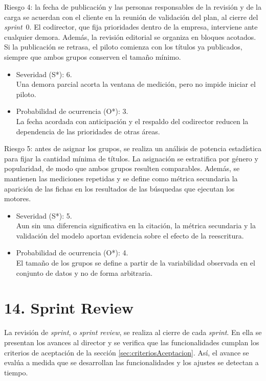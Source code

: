 \documentclass[
11pt, %
codirector, %
]{charter}
\begin{document}
Riesgo 4: la fecha de publicación y las personas responsables de la revisión y de la carga se acuerdan con el cliente en la reunión de validación del plan, al cierre del \textit{sprint}~0. El codirector, que fija prioridades dentro de la empresa, interviene ante cualquier demora. Además, la revisión editorial se organiza en bloques acotados. Si la publicación se retrasa, el piloto comienza con los títulos ya publicados, siempre que ambos grupos conserven el tamaño mínimo.
\begin{itemize}
	\item Severidad (S*): 6.\\
	Una demora parcial acorta la ventana de medición, pero no impide iniciar el piloto.
	\item Probabilidad de ocurrencia (O*): 3.\\
	La fecha acordada con anticipación y el respaldo del codirector reducen la dependencia de las prioridades de otras áreas.
\end{itemize}

Riesgo 5: antes de asignar los grupos, se realiza un análisis de potencia estadística para fijar la cantidad mínima de títulos. La asignación se estratifica por género y popularidad, de modo que ambos grupos resulten comparables. Además, se mantienen las mediciones repetidas y se define como métrica secundaria la aparición de las fichas en los resultados de las búsquedas que ejecutan los motores.
\begin{itemize}
	\item Severidad (S*): 5.\\
	Aun sin una diferencia significativa en la citación, la métrica secundaria y la validación del modelo aportan evidencia sobre el efecto de la reescritura.
	\item Probabilidad de ocurrencia (O*): 4.\\
	El tamaño de los grupos se define a partir de la variabilidad observada en el conjunto de datos y no de forma arbitraria.
\end{itemize}

\section{14. Sprint Review}
\label{sec:sprint_review}

La revisión de \textit{sprint}, o \textit{sprint review}, se realiza al cierre de cada \textit{sprint}. En ella se presentan los avances al director y se verifica que las funcionalidades cumplan los criterios de aceptación de la sección \ref{sec:criteriosAceptacion}. Así, el avance se evalúa a medida que se desarrollan las funcionalidades y los ajustes se detectan a tiempo.
\end{document}
